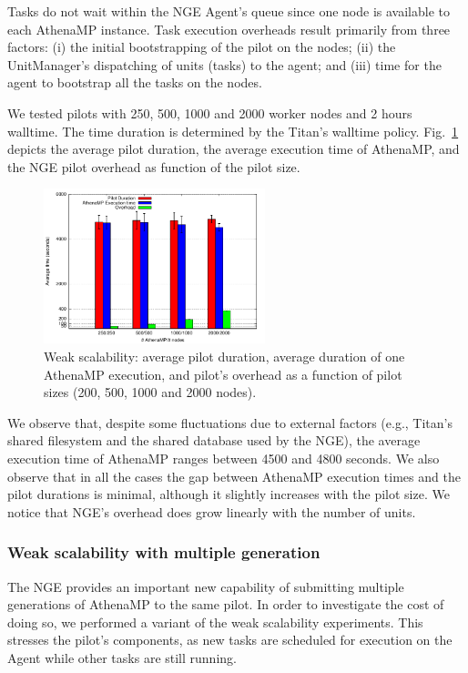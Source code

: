 Tasks do not wait within the NGE Agent's queue since one node is available to
each AthenaMP instance. Task execution  overheads result primarily from  three
factors: (i) the initial bootstrapping of the pilot on the nodes; (ii) the
UnitManager's dispatching of units (tasks) to the agent; and (iii) time for
the agent to bootstrap all the tasks on the nodes.

We tested pilots with 250, 500, 1000 and 2000 worker nodes and 2 hours
walltime. The time duration is determined by the Titan's walltime policy.
Fig.~\ref{fig:weakScal1a} depicts the average pilot duration, the average
execution time of AthenaMP, and the NGE pilot overhead as function of the
pilot size.

\begin{figure}[!t]
        \includegraphics[height=4.5cm,width=\columnwidth]{./figures/NGE/weak1.pdf}
   	\vspace{-0.3in}
    \caption{Weak scalability: average pilot duration, average duration of one AthenaMP execution, and pilot's overhead as a function of pilot sizes (200, 500, 1000 and 2000 nodes).}
\label{fig:weakScal1a}
\end{figure}

We observe that, despite some fluctuations due to external factors (e.g.,
Titan's shared filesystem and the shared database used by the NGE), the
average execution time of AthenaMP ranges between 4500 and 4800 seconds. We
also observe that in all the cases the gap between AthenaMP execution times
and the pilot durations is minimal, although it slightly increases with the
pilot size. We notice that NGE's overhead does grow linearly with the number
of units.

\subsubsection{Weak scalability with multiple generation }

The NGE provides an important new capability of submitting multiple
generations of AthenaMP to the same pilot. In order to investigate the cost
of doing so, we performed a variant of the weak scalability experiments. This
stresses the pilot's components, as new tasks are scheduled for execution on
the Agent while other tasks are still running.

